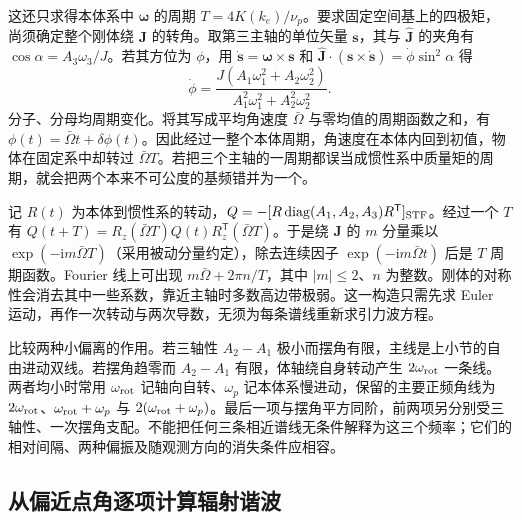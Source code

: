 这还只求得本体系中 $\bm\omega$ 的周期 $T=4K(k_e)/\nu_p$。要求固定空间基上的四极矩，尚须确定整个刚体绕 $\bm J$ 的转角。取第三主轴的单位矢量 $\bm s$，其与 $\hat{\bm J}$ 的夹角有 $\cos\alpha=A_3\omega_3/J$。若其方位为 $\phi$，用 $\dot{\bm s}=\bm\omega\times\bm s$ 和 $\hat{\bm J}\cdot(\bm s\times\dot{\bm s})=\dot\phi\sin^2\alpha$ 得
\[
 \dot\phi=\frac{J(A_1\omega_1^2+A_2\omega_2^2)}
                {A_1^2\omega_1^2+A_2^2\omega_2^2}.
\]
分子、分母均周期变化。将其写成平均角速度 $\bar\Omega$ 与零均值的周期函数之和，有 $\phi(t)=\bar\Omega t+\delta\phi(t)$。因此经过一整个本体周期，角速度在本体内回到初值，物体在固定系中却转过 $\bar\Omega T$。若把三个主轴的一周期都误当成惯性系中质量矩的周期，就会把两个本来不可公度的基频错并为一个。

记 $R(t)$ 为本体到惯性系的转动，$Q= -[R\,\mathrm{diag}(A_1,A_2,A_3)R^{\mathsf T}]_{\rm STF}$。经过一个 $T$ 有 $Q(t+T)=R_z(\bar\Omega T)Q(t)R_z^{\mathsf T}(\bar\Omega T)$。于是绕 $\bm J$ 的 $m$ 分量乘以 $\exp(-\mathrm i m\bar\Omega T)$（采用被动分量约定），除去连续因子 $\exp(-\mathrm im\bar\Omega t)$ 后是 $T$ 周期函数。Fourier 线上可出现 $m\bar\Omega+2\pi n/T$，其中 $|m|\le2$、$n$ 为整数。刚体的对称性会消去其中一些系数，靠近主轴时多数高边带极弱。这一构造只需先求 Euler 运动，再作一次转动与两次导数，无须为每条谱线重新求引力波方程。

比较两种小偏离的作用。若三轴性 $A_2-A_1$ 极小而摆角有限，主线是上小节的自由进动双线。若摆角趋零而 $A_2-A_1$ 有限，体轴绕自身转动产生 $2\omega_{\rm rot}$ 一条线。两者均小时常用 $\omega_{\rm rot}$ 记轴向自转、$\omega_p$ 记本体系慢进动，保留的主要正频角线为 $2\omega_{\rm rot}$、$\omega_{\rm rot}+\omega_p$ 与 $2(\omega_{\rm rot}+\omega_p)$。最后一项与摆角平方同阶，前两项另分别受三轴性、一次摆角支配。不能把任何三条相近谱线无条件解释为这三个频率；它们的相对间隔、两种偏振及随观测方向的消失条件应相容。

\subsection{从偏近点角逐项计算辐射谐波}


